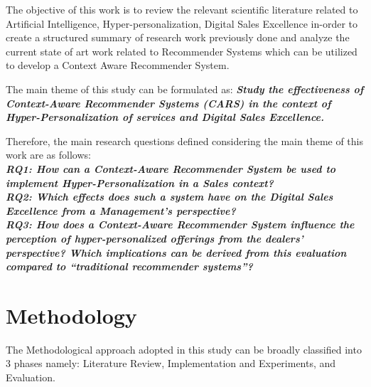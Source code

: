 \noindent
The objective of this work is to review the relevant scientific literature related to Artificial Intelligence, Hyper-personalization, Digital Sales Excellence in-order to create a structured summary of research work previously done and analyze the current state of art work related to Recommender Systems which can be utilized to develop a Context Aware Recommender System.  \\ \par
\noindent
The main theme of this study can be formulated as:  \textbf{\emph{Study the effectiveness of Context-Aware Recommender Systems (CARS) in the context of Hyper-Personalization of services and Digital Sales Excellence.}} \\ \par
\noindent
Therefore, the main research questions defined considering the main theme of this work are as follows: \\ 

\textbf{\emph{RQ1: How can a Context-Aware Recommender System be used to implement Hyper-Personalization in a Sales context?}} \\

\textbf{\emph{RQ2: Which effects does such a system have on the Digital Sales Excellence from a Management’s perspective?}} \\ 

\textbf{\emph{RQ3: How does a Context-Aware Recommender System influence the perception of hyper-personalized offerings from the dealers’ perspective? Which implications can be derived from this evaluation compared to “traditional recommender systems”?}}


\section{Methodology} 
The Methodological approach adopted in this study can be broadly classified into 3 phases namely: Literature Review, Implementation and Experiments, and Evaluation.
